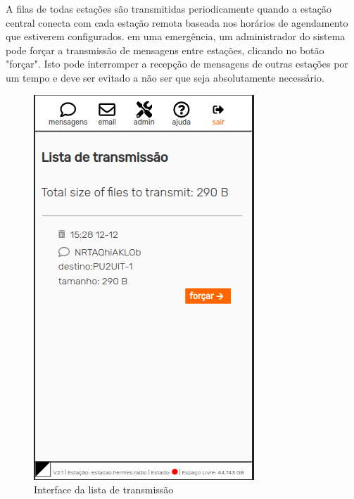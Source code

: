 \documentclass[11pt,a4paper]{article}
\begin{document}

A filas de todas estações são transmitidas periodicamente quando a estação central conecta com cada estação remota baseada nos horários de agendamento que estiverem configurados. em uma emergência, um administrador do sistema pode forçar a transmissão de mensagens entre estações, clicando no botão "forçar". Isto pode interromper a recepção de mensagens de outras estações por um tempo e deve ser evitado a não ser que seja absolutamente necessário.

    \begin{figure}[H]
    \centering
    \includegraphics[width=0.5\columnwidth]{screenshots/frontend/pt_kn/transmission.png}
    \caption{Interface da lista de transmissão}
    \label{fig:transmission}
   
    \end{figure}    
    
\end{document}
